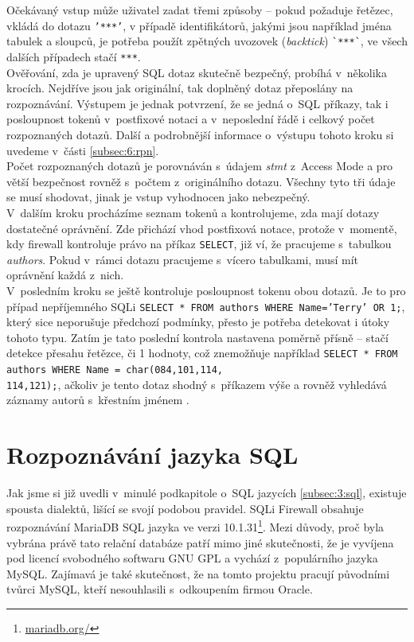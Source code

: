 Očekávaný vstup může uživatel zadat třemi způsoby -- pokud požaduje řetězec, vkládá do dotazu \texttt{'***'}, v případě identifikátorů,
jakými jsou například jména tabulek a sloupců, je potřeba použít zpětných uvozovek (\textit{backtick}) \texttt{\`{}***\`}, ve všech dalších 
případech stačí \texttt{***}. \\

Ověřování, zda je upravený SQL dotaz skutečně bezpečný, probíhá v~několika krocích. Nejdříve jsou jak originální, tak doplněný dotaz přeposlány
na rozpoznávání. Výstupem je jednak potvrzení, že se jedná o~SQL příkazy, tak i posloupnost tokenů v~postfixové notaci a v~neposlední řádě
i celkový počet rozpoznaných dotazů. Další a podrobnější informace o~výstupu tohoto kroku si uvedeme v~části \ref{subsec:6:rpn}.\\

Počet rozpoznaných dotazů je porovnáván s~údajem \textit{stmt} z~Access Mode a pro větší bezpečnost rovněž s~počtem z~originálního dotazu. 
Všechny tyto tři údaje se musí shodovat, jinak je vstup vyhodnocen jako nebezpečný. \\

V~dalším kroku procházíme seznam tokenů a kontrolujeme, zda mají dotazy dostatečné oprávnění. Zde přichází vhod postfixová notace, protože
v~momentě, kdy firewall kontroluje právo na příkaz \texttt{SELECT}, již ví, že pracujeme s~tabulkou \textit{authors}. Pokud v~rámci dotazu pracujeme s~vícero
tabulkami, musí mít oprávnění každá z~nich. \\

V~posledním kroku se ještě kontroluje posloupnost tokenu obou dotazů. Je to pro případ nepříjemného SQLi 
\texttt{SELECT * FROM authors WHERE Name='Terry' OR 1;}, který sice neporušuje předchozí podmínky, přesto je potřeba detekovat i útoky tohoto typu.
Zatím je tato poslední kontrola nastavena poměrně přísně -- stačí detekce přesahu řetězce, či 1 hodnoty, což znemožňuje například 
\texttt{SELECT * FROM authors WHERE Name = char(084,101,114,\\114,121);}, ačkoliv je tento dotaz shodný s~příkazem výše a rovněž vyhledává záznamy
autorů s~křestním jménem . 

\section{Rozpoznávání jazyka SQL} \label{sec:6:parser}
Jak jsme si již uvedli v~minulé podkapitole o~SQL jazycích \ref{subsec:3:sql}, existuje spousta dialektů, lišící se svojí podobou pravidel.
SQLi Firewall obsahuje rozpoznávání MariaDB SQL jazyka ve verzi 10.1.31\footnote{\url{mariadb.org/}}. Mezi důvody, proč byla vybrána právě tato relační 
databáze patří mimo jiné skutečnosti, že je vyvíjena pod licencí svobodného softwaru GNU GPL a vychází z~populárního jazyka MySQL.
Zajímavá je také skutečnost, že na tomto projektu pracují původními tvůrci MySQL, kteří nesouhlasili s~odkoupením firmou Oracle. \\

